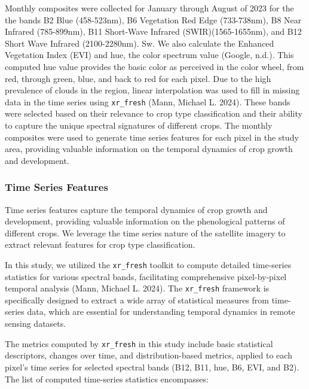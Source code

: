 \documentclass[
]{article}
\begin{document}
Monthly composites were collected for January through August of 2023 for
the the bands B2 Blue (458-523nm), B6 Vegetation Red Edge (733-738nm),
B8 Near Infrared (785-899nm), B11 Short-Wave Infrared
(SWIR)(1565-1655nm), and B12 Short Wave Infrared (2100-2280nm). Sw. We
also calculate the Enhanced Vegetation Index (EVI) and hue, the color
spectrum value (Google, n.d.). This computed hue value provides the
basic color as perceived in the color wheel, from red, through green,
blue, and back to red for each pixel. Due to the high prevalence of
clouds in the region, linear interpolation was used to fill in missing
data in the time series using \texttt{xr\_fresh} (Mann, Michael L.
2024). These bands were selected based on their relevance to crop type
classification and their ability to capture the unique spectral
signatures of different crops. The monthly composites were used to
generate time series features for each pixel in the study area,
providing valuable information on the temporal dynamics of crop growth
and development.

\hypertarget{time-series-features}{%
\subsubsection{Time Series Features}\label{time-series-features}}

Time series features capture the temporal dynamics of crop growth and
development, providing valuable information on the phenological patterns
of different crops. We leverage the time series nature of the satellite
imagery to extract relevant features for crop type classification.

In this study, we utilized the \texttt{xr\_fresh} toolkit to compute
detailed time-series statistics for various spectral bands, facilitating
comprehensive pixel-by-pixel temporal analysis (Mann, Michael L. 2024).
The \texttt{xr\_fresh} framework is specifically designed to extract a
wide array of statistical measures from time-series data, which are
essential for understanding temporal dynamics in remote sensing
datasets.

The metrics computed by \texttt{xr\_fresh} in this study include basic
statistical descriptors, changes over time, and distribution-based
metrics, applied to each pixel's time series for selected spectral bands
(B12, B11, hue, B6, EVI, and B2). The list of computed time-series
statistics encompasses:
\end{document}
